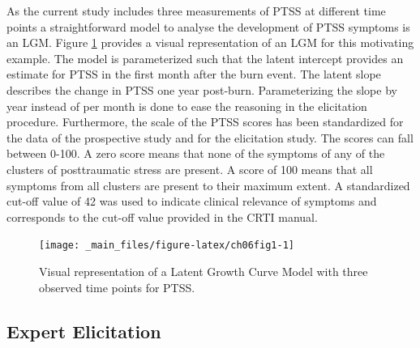 \documentclass[openright,titlepage,12pt,a4paper]{book}
\begin{document}
As the current study includes three measurements of PTSS at different time points a straightforward model to analyse the development of PTSS symptoms is an LGM. Figure \ref{fig:ch06fig1} provides a visual representation of an LGM for this motivating example. The model is parameterized such that the latent intercept provides an estimate for PTSS in the first month after the burn event. The latent slope describes the change in PTSS one year post-burn. Parameterizing the slope by year instead of per month is done to ease the reasoning in the elicitation procedure. Furthermore, the scale of the PTSS scores has been standardized for the data of the prospective study and for the elicitation study. The scores can fall between 0-100. A zero score means that none of the symptoms of any of the clusters of posttraumatic stress are present. A score of 100 means that all symptoms from all clusters are present to their maximum extent. A standardized cut-off value of 42 was used to indicate clinical relevance of symptoms and corresponds to the cut-off value provided in the CRTI manual.

\begin{figure}

{\centering \texttt{[image: \_main\_files/figure-latex/ch06fig1-1]} 

}

\caption{Visual representation of a Latent Growth Curve Model with three observed time points for PTSS. }\label{fig:ch06fig1}
\end{figure}

\hypertarget{expert-elicitation-1}{%
\subsection{Expert Elicitation}\label{expert-elicitation-1}}
\end{document}
